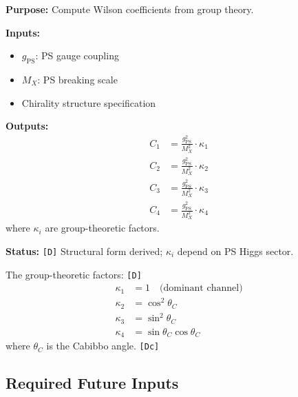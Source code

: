 \documentclass[11pt,a4paper]{article}
\newcommand{\tagD}{\textcolor{green!50!black}{\texttt{[D]}}}
\newcommand{\tagDc}{\textcolor{blue!70!black}{\texttt{[Dc]}}}
\theoremstyle{definition}
\begin{document}
\begin{apibox}
\textbf{Purpose:} Compute Wilson coefficients from group theory.

\textbf{Inputs:}
\begin{itemize}
  \item $g_{\text{PS}}$: PS gauge coupling
  \item $M_X$: PS breaking scale
  \item Chirality structure specification
\end{itemize}

\textbf{Outputs:}
\begin{align}
\label{eq:api-pd2-c1}
C_1 &= \frac{g_{\text{PS}}^2}{M_X^2} \cdot \kappa_1 \\
\label{eq:api-pd2-c2}
C_2 &= \frac{g_{\text{PS}}^2}{M_X^2} \cdot \kappa_2 \\
\label{eq:api-pd2-c3}
C_3 &= \frac{g_{\text{PS}}^2}{M_X^2} \cdot \kappa_3 \\
\label{eq:api-pd2-c4}
C_4 &= \frac{g_{\text{PS}}^2}{M_X^2} \cdot \kappa_4
\end{align}
where $\kappa_i$ are group-theoretic factors.

\textbf{Status:} \tagD{} Structural form derived; $\kappa_i$ depend on PS Higgs sector.
\end{apibox}

The group-theoretic factors: \tagD{}
\begin{align}
\label{eq:kappa1}
\kappa_1 &= 1 \quad \text{(dominant channel)} \\
\label{eq:kappa2}
\kappa_2 &= \cos^2\theta_C \\
\label{eq:kappa3}
\kappa_3 &= \sin^2\theta_C \\
\label{eq:kappa4}
\kappa_4 &= \sin\theta_C \cos\theta_C
\end{align}
where $\theta_C$ is the Cabibbo angle. \tagDc{}

\subsection{Required Future Inputs}
\label{subsec:future-inputs}
\end{document}
